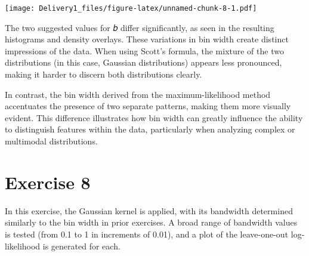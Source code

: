 \documentclass[
]{article}
\begin{document}
\texttt{[image: Delivery1\_files/figure-latex/unnamed-chunk-8-1.pdf]}

The two suggested values for 𝑏 differ significantly, as seen in the
resulting histograms and density overlays. These variations in bin width
create distinct impressions of the data. When using Scott's formula, the
mixture of the two distributions (in this case, Gaussian distributions)
appears less pronounced, making it harder to discern both distributions
clearly.

In contrast, the bin width derived from the maximum-likelihood method
accentuates the presence of two separate patterns, making them more
visually evident. This difference illustrates how bin width can greatly
influence the ability to distinguish features within the data,
particularly when analyzing complex or multimodal distributions.

\section{Exercise 8}\label{exercise-8}

In this exercise, the Gaussian kernel is applied, with its bandwidth
determined similarly to the bin width in prior exercises. A broad range
of bandwidth values is tested (from 0.1 to 1 in increments of 0.01), and
a plot of the leave-one-out log-likelihood is generated for each.
\end{document}
